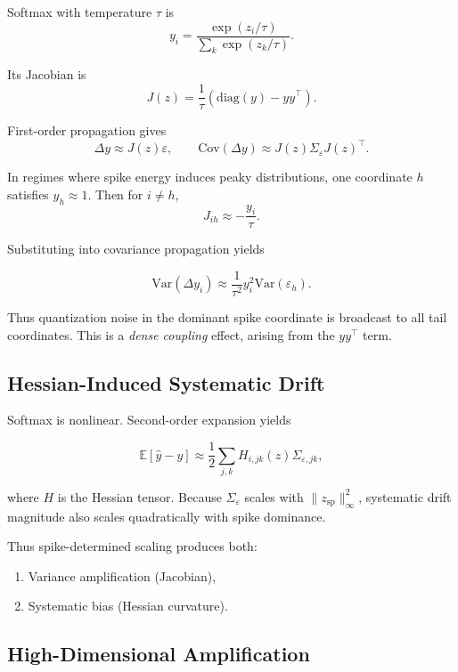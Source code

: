 Softmax with temperature $\tau$ is
\[
y_i = \frac{\exp(z_i/\tau)}{\sum_k \exp(z_k/\tau)}.
\]

Its Jacobian is
\begin{equation}
J(z)
=
\frac{1}{\tau}
\left(\mathrm{diag}(y) - y y^\top\right).
\label{eq:jacobian_softmax}
\end{equation}

First-order propagation gives
\[
\Delta y \approx J(z)\varepsilon,
\qquad
\mathrm{Cov}(\Delta y)
\approx
J(z)\Sigma_\varepsilon J(z)^\top.
\]

In regimes where spike energy induces peaky distributions,
one coordinate $h$ satisfies $y_h \approx 1$.
Then for $i \neq h$,
\[
J_{ih} \approx -\frac{y_i}{\tau}.
\]

Substituting into covariance propagation yields

\begin{equation}
\mathrm{Var}(\Delta y_i)
\approx
\frac{1}{\tau^2}
y_i^2
\mathrm{Var}(\varepsilon_h).
\label{eq:broadcast}
\end{equation}

Thus quantization noise in the dominant spike coordinate
is broadcast to all tail coordinates.
This is a \emph{dense coupling} effect,
arising from the $y y^\top$ term.

\subsection{Hessian-Induced Systematic Drift}

Softmax is nonlinear.
Second-order expansion yields

\[
\mathbb{E}[\hat y - y]
\approx
\frac{1}{2}
\sum_{j,k}
H_{i,jk}(z)
\Sigma_{\varepsilon,jk},
\]

where $H$ is the Hessian tensor.
Because $\Sigma_\varepsilon$ scales with $\|z_{\mathrm{sp}}\|_\infty^2$,
systematic drift magnitude also scales quadratically with spike dominance.

Thus spike-determined scaling produces both:

\begin{enumerate}
\item Variance amplification (Jacobian),
\item Systematic bias (Hessian curvature).
\end{enumerate}

\subsection{High-Dimensional Amplification}

